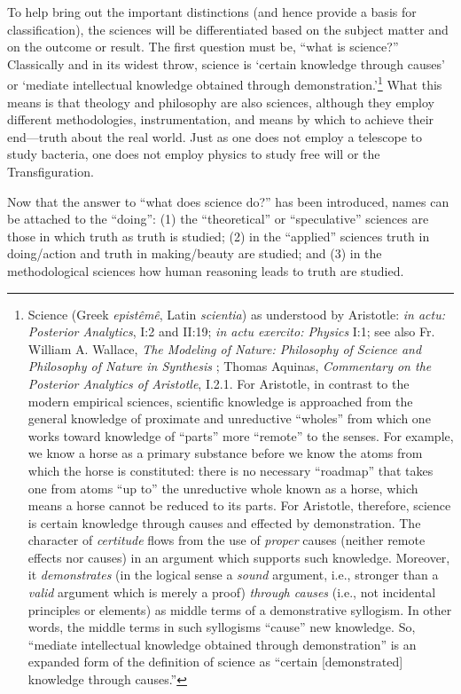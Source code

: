 To help bring out the important distinctions (and hence provide a basis for classification), the sciences will be differentiated based on the subject matter and on the outcome or result. The first question must be, ``what is science?'' Classically and in its widest throw, science is `certain knowledge through causes' or `mediate intellectual knowledge obtained through demonstration.'\footnote{%
Science (Greek \textit{epistêmê}, Latin \textit{scientia}) as understood by Aristotle: \textit{in actu: Posterior Analytics}, I:2 and II:19; \textit{in actu exercito: Physics} I:1; see also Fr. William A. Wallace, \textit{The Modeling of Nature: Philosophy of Science and Philosophy of Nature in Synthesis} \citep[][p.~231]{wallace1997}; Thomas Aquinas, \textit{Commentary on the Posterior Analytics of Aristotle}, I.2.1. For Aristotle, in contrast to the modern empirical sciences, scientific knowledge is approached from the general knowledge of proximate and unreductive “wholes” from which one works toward knowledge of “parts” more “remote” to the senses. For example, we know a horse as a primary substance before we know the atoms from which the horse is constituted: there is no necessary “roadmap” that takes one from atoms “up to” the unreductive whole known as a horse, which means a horse cannot be reduced to its parts. For Aristotle, therefore, science is certain knowledge through causes and effected by demonstration. The character of \textit{certitude} flows from the use of \textit{proper} causes (neither remote effects nor causes) in an argument which supports such knowledge. Moreover, it \textit{demonstrates} (in the logical sense a \textit{sound} argument, i.e., stronger than a \textit{valid} argument which is merely a proof) \textit{through causes} (i.e., not incidental principles or elements) as middle terms of a demonstrative syllogism. In other words, the middle terms in such syllogisms “cause” new knowledge. So, “mediate intellectual knowledge obtained through demonstration” is an expanded form of the definition of science as “certain [demonstrated] knowledge through causes.”
} What this means is that theology and philosophy are also sciences, although they employ different methodologies, instrumentation, and means by which to achieve their end---truth about the real world. Just as one does not employ a telescope to study bacteria, one does not employ physics to study free will or the Transfiguration.

Now that the answer to ``what does science do?'' has been introduced, names can be attached to the ``doing'': (1) the ``theoretical'' or ``speculative'' sciences are those in which truth as truth is studied; (2) in the ``applied'' sciences truth in doing/action and truth in making/beauty are studied; and (3) in the methodological sciences how human reasoning leads to truth are studied.

